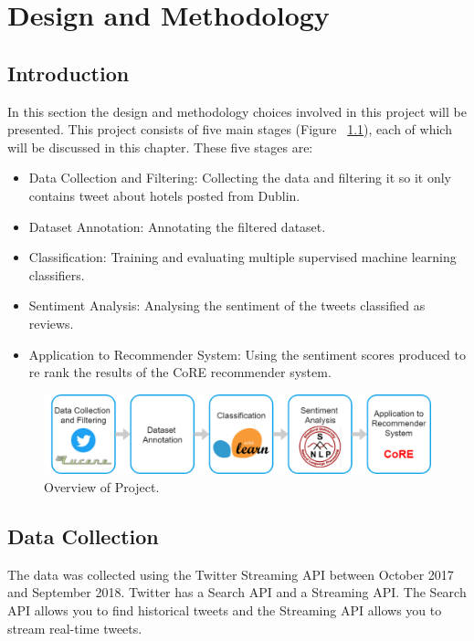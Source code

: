 \chapter{Design and Methodology}

\section{Introduction}

In this section the design and methodology choices involved in this project will be presented. This project consists of five main stages (Figure ~\ref{fig:pipeline}), each of which will be discussed in this chapter. These five stages are:
\begin{itemize}
    \item Data Collection and Filtering: Collecting the data and filtering it so it only contains tweet about hotels posted from Dublin.
    \item Dataset Annotation: Annotating the filtered dataset.
    \item Classification: Training and evaluating multiple supervised machine learning classifiers.
    \item Sentiment Analysis: Analysing the sentiment of the tweets classified as reviews.
    \item Application to Recommender System: Using the sentiment scores produced to re rank the results of the CoRE recommender system.
\end{itemize}

\begin{figure}[h!]
\centering
\includegraphics[width=1\textwidth]{project/pipeline.png}
\caption{\label{fig:pipeline} Overview of Project.}
\end{figure}

\section{Data Collection}
The data was collected using the Twitter Streaming API between October 2017 and September 2018. Twitter has a Search API and a Streaming API. The Search API allows you to find historical tweets and the Streaming API allows you to stream real-time tweets.

